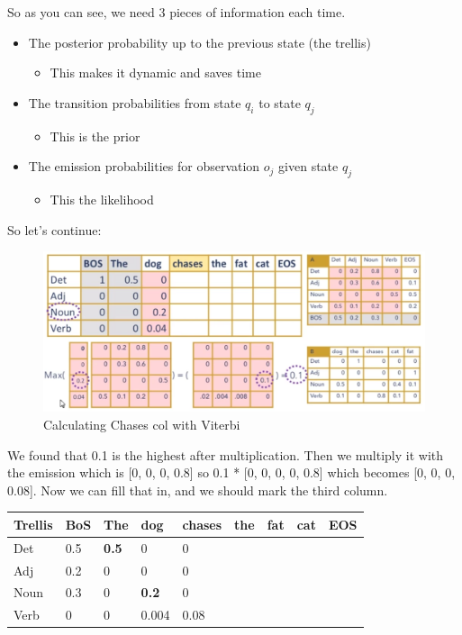 \documentclass[
  11pt,
  british,
]{article}
\providecommand{\tightlist}{%
  \setlength{\itemsep}{0pt}\setlength{\parskip}{0pt}}
\begin{document}
So as you can see, we need 3 pieces of information each time.

\begin{itemize}
\tightlist
\item
  The posterior probability up to the previous state (the trellis)

  \begin{itemize}
  \tightlist
  \item
    This makes it dynamic and saves time
  \end{itemize}
\item
  The transition probabilities from state \(q_i\) to state \(q_j\)

  \begin{itemize}
  \tightlist
  \item
    This is the prior
  \end{itemize}
\item
  The emission probabilities for observation \(o_j\) given state \(q_j\)

  \begin{itemize}
  \tightlist
  \item
    This the likelihood
  \end{itemize}
\end{itemize}

So let's continue:

\begin{figure}
\centering
\includegraphics{Pasted_image_20220308195301.png}
\caption{Calculating Chases col with Viterbi}
\end{figure}

We found that 0.1 is the highest after multiplication. Then we multiply
it with the emission which is {[}0, 0, 0, 0.8{]} so 0.1 * {[}0, 0, 0, 0,
0.8{]} which becomes {[}0, 0, 0, 0.08{]}. Now we can fill that in, and
we should mark the third column.

\begin{longtable}[]{@{}lllllllll@{}}
\toprule
Trellis & BoS & The & dog & chases & the & fat & cat & EOS \\
\midrule
\endhead
Det & 0.5 & \textbf{0.5} & 0 & 0 & & & & \\
Adj & 0.2 & 0 & 0 & 0 & & & & \\
Noun & 0.3 & 0 & \textbf{0.2} & 0 & & & & \\
Verb & 0 & 0 & 0.004 & 0.08 & & & & \\
\bottomrule
\end{longtable}
\end{document}
